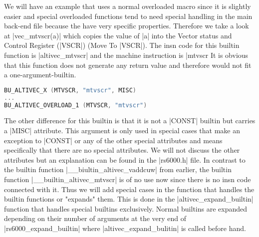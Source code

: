 We will have an example that uses a normal overloaded macro since it is slightly easier and special overloaded functions tend to need special handling in the main back-end file because the have very specific properties. Therefore we take a look at |vec_mtvscr(a)| which copies the value of |a| into the Vector status and Control Register (|VSCR|) (Move To |VSCR|). The insn code for this builtin function is |altivec_mtvscr| and the machine instruction is |mtvscr %
It is obvious that this function does not generate any return value and therefore would not fit a one-argument-builtin.
\begin{lstlisting}[language=C++,basicstyle=\ttfamily\scriptsize,keywordstyle=\color{red}] 
BU_ALTIVEC_X (MTVSCR, "mtvscr",	MISC)
...
BU_ALTIVEC_OVERLOAD_1 (MTVSCR, "mtvscr")
\end{lstlisting}
The other difference for this builtin is that it is not a |CONST| builtin but carries a |MISC| attribute. This argument is only used in special cases that make an exception to |CONST| or any of the other special attributes and means specifically that there are no special attributes. We will not discuss the other attributes but an explanation can be found in the |rs6000.h| file.
In contrast to the builtin function |__biultin_altivec_vaddcuw| from earlier, the builtin function |__builtin_altivec_mtvscr| is of no use now since there is no insn code connected with it. Thus we will add special cases in the function that handles the builtin functions or "expands" them. This is done in the |altivec_expand_builtin| function that handles special builtins exclusively. Normal builtins are expanded depending on their number of arguments at the very end of |rs6000_expand_builtin| where |altivec_expand_bulitin| is called before hand. 

